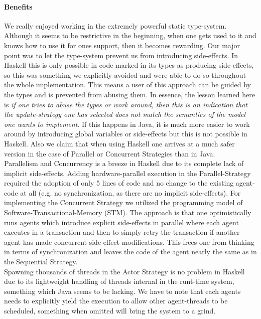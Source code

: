 \paragraph{Benefits}
We really enjoyed working in the extremely powerful static type-system. Although it seems to be restrictive in the beginning, when one gets used to it and knows how to use it for ones support, then it becomes rewarding. Our major point was to let the type-system prevent us from introducing side-effects. In Haskell this is only possible in code marked in its types as producing side-effects, so this was something we explicitly avoided and were able to do so throughout the whole implementation. This means a user of this approach can be guided by the types and is prevented from abusing them. In essence, the lesson learned here is \textit{if one tries to abuse the types or work around, then this is an indication that the update-strategy one has selected does not match the semantics of the model one wants to implement}. If this happens in Java, it is much more easier to work around by introducing global variables or side-effects but this is not possible in Haskell. Also we claim that when using Haskell one arrives at a much safer version in the case of Parallel or Concurrent Strategies than in Java.\\

Parallelism and Concurrency is a breeze in Haskell due to its complete lack of implicit side-effects. Adding hardware-parallel execution in the Parallel-Strategy required the adoption of only 5 lines of code and no change to the existing agent-code at all (e.g. no synchronization, as there are no implicit side-effects). For implementing the Concurrent Strategy we utilized the programming model of Software-Transactional-Memory (STM). The approach is that one optimistically runs agents which introduce explicit side-effects in parallel where each agent executes in a transaction and then to simply retry the transaction if another agent has made concurrent side-effect modifications. This frees one from thinking in terms of synchronization and leaves the code of the agent nearly the same as in the Sequential Strategy. \\
Spawning thousands of threads in the Actor Strategy is no problem in Haskell due to its lightweight handling of threads internal in the runt-time system, something which Java seems to be lacking. We have to note that each agents needs to explicitly yield the execution to allow other agent-threads to be scheduled, something when omitted will bring the system to a grind.

